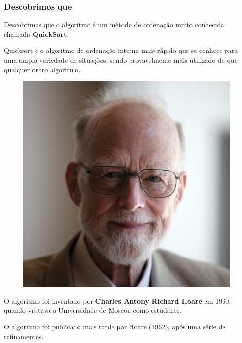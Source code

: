 \documentclass[
	11pt, %
]{beamer}
\begin{document}
\begin{frame}
	\frametitle{Descobrimos que}
	\justifying Descobrimos que o algoritmo é um método de ordenação muito conhecida chamada \textbf{QuickSort}.
	
	\bigskip
	
	\small
	Quicksort é o algoritmo de ordenação interna mais rápido que se conhece para uma ampla variedade de situações, sendo provavelmente mais utilizado do que qualquer outro algoritmo.
	
	\bigskip
	\begin{figure}
		\includegraphics[width=1\linewidth]{Sir_Tony_Hoare_IMG_5125.jpg}
	\end{figure}

	O algoritmo foi inventado por \textbf{Charles Antony Richard Hoare} em 1960, quando visitava a Universidade de Moscou como estudante.
	
	\bigskip
	O algoritmo foi publicado mais tarde por Hoare (1962), após uma série de refinamentos.
	

\end{frame}
\end{document}
